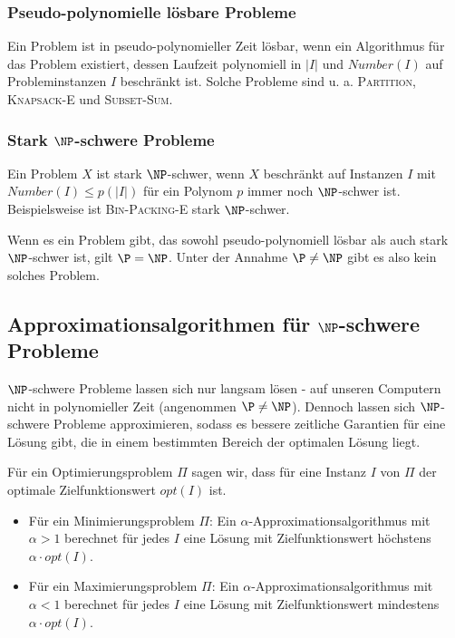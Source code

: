 \documentclass[a4paper,parskip=half*,DIV=7,fontsize=11pt]{scrartcl}
\begin{document}
\subsubsection{Pseudo-polynomielle lösbare Probleme}
Ein Problem ist in pseudo-polynomieller Zeit lösbar, wenn ein Algorithmus für das Problem existiert, dessen Laufzeit polynomiell in $\vert I \vert$ und $Number(I)$ auf Probleminstanzen $I$ beschränkt ist. Solche Probleme sind u. a. \textsc{Partition}, \textsc{Knapsack-E} und \textsc{Subset-Sum}.

\subsubsection{Stark $\NP$-schwere Probleme}
Ein Problem $X$ ist stark $\NP$-schwer, wenn $X$ beschränkt auf Instanzen $I$ mit $Number(I)\leq p(\vert I \vert)$ für ein Polynom $p$ immer noch $\NP$-schwer ist. Beispielsweise ist \textsc{Bin-Packing-E} stark $\NP$-schwer.

Wenn es ein Problem gibt, das sowohl pseudo-polynomiell lösbar als auch stark $\NP$-schwer ist, gilt $\P=\NP$. Unter der Annahme $\P\neq\NP$ gibt es also kein solches Problem.

\subsection[Approximationsalgorithmen für NP-schwere Probleme]{Approximationsalgorithmen für $\NP$-schwere Probleme}
$\NP$-schwere Probleme lassen sich nur langsam lösen - auf unseren Computern nicht in polynomieller Zeit (angenommen $\P \neq \NP$). Dennoch lassen sich $\NP$-schwere Probleme approximieren, sodass es bessere zeitliche Garantien für eine Lösung gibt, die in einem bestimmten Bereich der optimalen Lösung liegt.

Für ein Optimierungsproblem $\Pi$ sagen wir, dass für eine Instanz $I$ von $\Pi$ der optimale Zielfunktionswert $opt(I)$ ist.

\begin{itemize}
\item Für ein Minimierungsproblem $\Pi$: Ein $\alpha$-Approximationsalgorithmus mit $\alpha > 1$ berechnet für jedes $I$ eine Lösung mit Zielfunktionswert höchstens $\alpha \cdot opt(I)$.
\item Für ein Maximierungsproblem $\Pi$: Ein $\alpha$-Approximationsalgorithmus mit $\alpha < 1$ berechnet für jedes $I$ eine Lösung mit Zielfunktionswert mindestens $\alpha \cdot opt(I)$.
\end{itemize}
\end{document}
